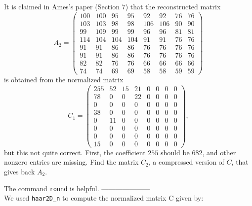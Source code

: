 \documentclass[12pt]{article}
\begin{document}
\medskip
It is claimed in Ames's paper (Section 7) that the reconstructed  matrix
\[
A_2 =
\begin{pmatrix}
100  &  100  &   95  &   95  &   92  &   92  &   76  &   76 \\
   103 &   103  &   98  &   98  &  106  &  106  &   90  &   90 \\
    99  &  109  &   99  &   99  &   96  &   96  &   81  &   81 \\
   114  &  104  &  104  &  104  &   91  &   91  &   76  &   76 \\
    91  &   91  &   86  &   86  &   76  &   76  &   76  &   76 \\
    91  &   91  &   86  &   86  &   76  &   76  &   76  &   76 \\
    82  &   82  &   76  &   76  &   66  &   66  &   66  &   66 \\
    74  &   74  &   69  &   69  &   58  &   58  &   59  &  59
\end{pmatrix}
\]
is obtained from the normalized matrix
\[
C_1 =
\begin{pmatrix}
255  &  52  &   15  &  21  &  0  &  0  &  0  &  0 \\
78   &    0   &    0   &  22  &  0  &  0  &  0  &  0 \\
0     &    0   &    0   &    0  &  0  &  0  &  0  &  0 \\
38     &    0   &    0   &    0  &  0  &  0  &  0  &  0 \\
0     &   11  &    0   &    0  &  0  &  0  &  0  &  0 \\
0     &    0   &    0   &    0  &  0  &  0  &  0  &  0 \\
0     &    0   &    0   &    0  &  0  &  0  &  0  &  0 \\
15     &    0   &    0   &    0  &  0  &  0  &  0  &  0 
\end{pmatrix},
\]
but this not quite correct. First, the coefficient $255$ should be
$682$, and other nonzero entries are missing.
Find the matrix $C_2$, a compressed version of $C$, that gives back
$A_2$.

\medskip
\hint
The command {\tt round} is helpful.
---------------------\\
We used {\tt haar2D\_n} to compute the normalized matrix C given by:
\end{document}
